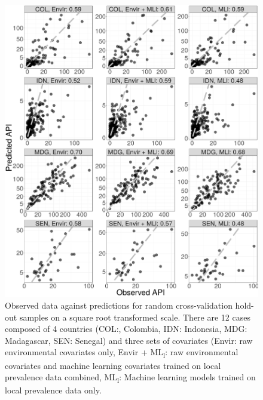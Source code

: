 \documentclass[review]{elsarticle}
\begin{document}
\begin{figure}
  \includegraphics[width=\textwidth]{figs/cv1_l_scatter.png}
\caption{
  Observed data against predictions for random cross-validation hold-out samples on a square root transformed scale. 
  There are 12 cases composed of 4 countries (COL:, Colombia, IDN: Indonesia, MDG: Madagascar, SEN: Senegal) and three sets of covariates (Envir: raw environmental covariates only, Envir +  ML\textsubscript{l}: raw environmental covariates and machine learning covariates trained on local prevalence data combined, ML\textsubscript{l}: Machine learning models trained on local prevalence data only.
}
\label{f:scatter1}
\end{figure}
\end{document}

